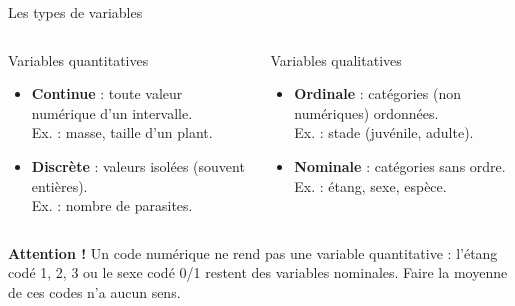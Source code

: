 \documentclass{BeamerTemplate}
\begin{document}
\begin{frame}[t]{Les types de variables}
  \small
  \begin{columns}[T]
    \begin{Boite}{Variables quantitatives}
      \begin{itemize}
        \item \textbf{Continue} : toute valeur numérique d'un intervalle.\\
          Ex. : masse, taille d'un plant.
        \item \textbf{Discrète} : valeurs isolées (souvent entières).\\
          Ex. : nombre de parasites.
      \end{itemize}
    \end{Boite}
    \begin{Boite}{Variables qualitatives}
      \begin{itemize}
        \item \textbf{Ordinale} : catégories (non numériques) ordonnées.\\
          Ex. : stade (juvénile, adulte).
        \item \textbf{Nominale} : catégories sans ordre.\\
          Ex. : étang, sexe, espèce.
      \end{itemize}
    \end{Boite}
  \end{columns}


  \textbf{Attention !} Un code numérique ne rend pas une variable
  quantitative : l'étang codé 1, 2, 3 ou le sexe codé 0/1 restent des
  variables \alert{nominales}. Faire la moyenne de ces codes n'a aucun sens.

\end{frame}
\end{document}
